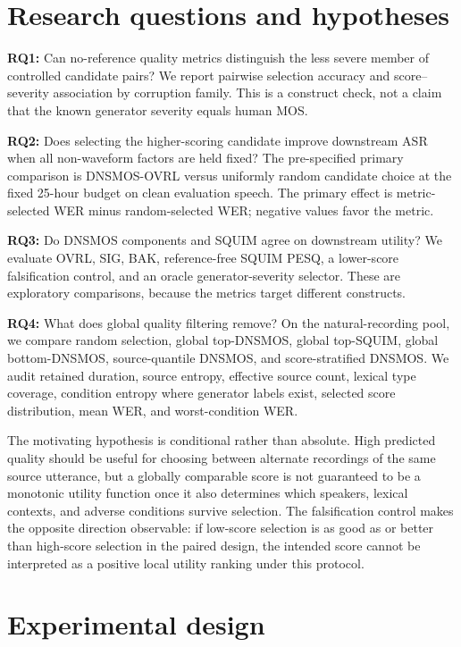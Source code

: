 \documentclass[10pt,twocolumn]{article}
\newcommand{\dns}{\textsc{DNSMOS}}
\newcommand{\squim}{\textsc{SQUIM}}
\newcommand{\wer}{\textsc{WER}}
\newcommand{\asr}{\textsc{ASR}}
\begin{document}
\section{Research questions and hypotheses}

\textbf{RQ1:} Can no-reference quality metrics distinguish the less severe member of controlled candidate pairs? We report pairwise selection accuracy and score--severity association by corruption family. This is a construct check, not a claim that the known generator severity equals human MOS.

\textbf{RQ2:} Does selecting the higher-scoring candidate improve downstream \asr{} when all non-waveform factors are held fixed? The pre-specified primary comparison is \dns{}-OVRL versus uniformly random candidate choice at the fixed 25-hour budget on clean evaluation speech. The primary effect is metric-selected \wer{} minus random-selected \wer{}; negative values favor the metric.

\textbf{RQ3:} Do \dns{} components and \squim{} agree on downstream utility? We evaluate OVRL, SIG, BAK, reference-free \squim{} PESQ, a lower-score falsification control, and an oracle generator-severity selector. These are exploratory comparisons, because the metrics target different constructs.

\textbf{RQ4:} What does global quality filtering remove? On the natural-recording pool, we compare random selection, global top-\dns{}, global top-\squim{}, global bottom-\dns{}, source-quantile \dns{}, and score-stratified \dns{}. We audit retained duration, source entropy, effective source count, lexical type coverage, condition entropy where generator labels exist, selected score distribution, mean \wer{}, and worst-condition \wer{}.

The motivating hypothesis is conditional rather than absolute. High predicted quality should be useful for choosing between alternate recordings of the same source utterance, but a globally comparable score is not guaranteed to be a monotonic utility function once it also determines which speakers, lexical contexts, and adverse conditions survive selection. The falsification control makes the opposite direction observable: if low-score selection is as good as or better than high-score selection in the paired design, the intended score cannot be interpreted as a positive local utility ranking under this protocol.

\section{Experimental design}
\end{document}
